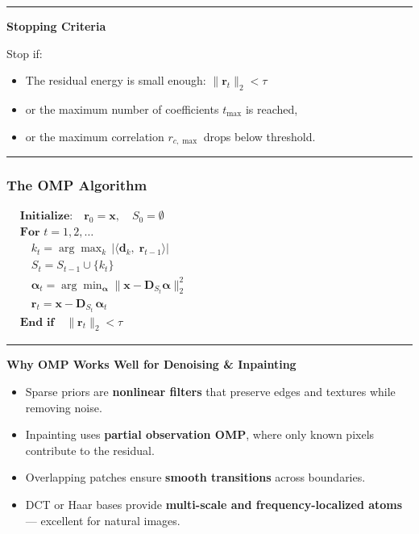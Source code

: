 \documentclass[11pt]{article}
\providecommand{\tightlist}{%
      \setlength{\itemsep}{0pt}\setlength{\parskip}{0pt}}
\begin{document}
\begin{center}\rule{0.5\linewidth}{0.5pt}\end{center}

\textbf{Stopping Criteria}

Stop if:

\begin{itemize}
\tightlist
\item
  The residual energy is small enough: \(\|\mathbf{r}_t\|_2 < \tau\)
\item
  or the maximum number of coefficients \(t_{\max}\) is reached,
\item
  or the maximum correlation \(r_{c,\max}\) drops below threshold.
\end{itemize}

\begin{center}\rule{0.5\linewidth}{0.5pt}\end{center}

\hypertarget{the-omp-algorithm}{%
\subsubsection{\texorpdfstring{\textbf{The OMP
Algorithm}}{The OMP Algorithm}}\label{the-omp-algorithm}}

\(\boxed{ \begin{aligned} &\textbf{Initialize:}\quad \mathbf{r}_0 = \mathbf{x},\quad S_0 = \emptyset \\[4pt] &\textbf{For } t = 1, 2, \ldots \\[4pt] &\quad k_t = \arg\max_{k}\, |\langle \mathbf{d}_k,\; \mathbf{r}_{t-1} \rangle| \\[6pt] &\quad S_t = S_{t-1} \cup \{k_t\} \\[6pt] &\quad \boldsymbol{\alpha}_t  = \arg\min_{\boldsymbol{\alpha}}  \|\mathbf{x} - \mathbf{D}_{S_t}\boldsymbol{\alpha}\|_2^{2} \\[6pt] &\quad \mathbf{r}_t = \mathbf{x} - \mathbf{D}_{S_t}\,\boldsymbol{\alpha}_t \\[6pt] &\textbf{End if}\quad \|\mathbf{r}_t\|_2 < \tau \end{aligned} }\)

\begin{center}\rule{0.5\linewidth}{0.5pt}\end{center}

\textbf{Why OMP Works Well for Denoising \& Inpainting}

\begin{itemize}
\tightlist
\item
  Sparse priors are \textbf{nonlinear filters} that preserve edges and
  textures while removing noise.
\item
  Inpainting uses \textbf{partial observation OMP}, where only known
  pixels contribute to the residual.
\item
  Overlapping patches ensure \textbf{smooth transitions} across
  boundaries.
\item
  DCT or Haar bases provide \textbf{multi-scale and frequency-localized
  atoms} --- excellent for natural images.
\end{itemize}
\end{document}

